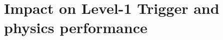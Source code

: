 \endgroup
	
%	
%	
%	
	
\section{Impact on Level-1 Trigger and physics performance}
\label{chapt3:sec:L1tP2}

